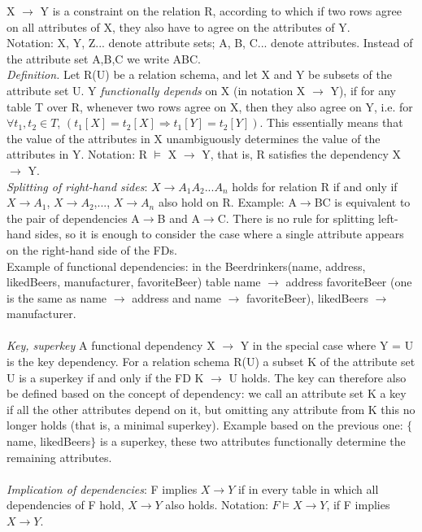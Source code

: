 \documentclass[margin=0px]{article}
\begin{document}
X $\to$ Y is a constraint on the relation R, according to which if two rows agree on all attributes of X, they also have to agree on the attributes of Y. \\
Notation: X, Y, Z... denote attribute sets; A, B, C... denote attributes. Instead of the attribute set {A,B,C} we write ABC. \\
\textit{Definition.} Let R(U) be a relation schema, and let X and Y be subsets of the attribute set U. Y \textit{functionally depends} on X (in notation X $\to$ Y), if for any table T over R, whenever two rows agree on X, then they also agree on Y, i.e. for $\forall t_1, t_2 \in T$, $(t_1[X]=t_2[X] \Rightarrow t_1[Y]=t_2[Y])$. This essentially means that the value of the attributes in X unambiguously determines the value of the attributes in Y. Notation: R $\models$ X $\to$ Y, that is,
R satisfies the dependency X $\to$ Y. \\
\textit{Splitting of right-hand sides}: $X \to A_1A_2...A_n$ holds for relation R if and only if $X \to A_1$, $X \to A_2$,..., $X \to A_n$ also hold on R. Example: A$\to$BC is equivalent to the pair of dependencies A$\to$B and
A$\to$C. There is no rule for splitting left-hand sides, so it is enough to consider the case where a single attribute appears on the right-hand side of the FDs. \\
Example of functional dependencies: in the Beerdrinkers(name, address, likedBeers, manufacturer, favoriteBeer) table name $\to$ address favoriteBeer (one is the same as name $\to$ address and name $\to$ favoriteBeer), likedBeers $\to$ manufacturer. \\ \\
\textit{Key, superkey} A functional dependency X $\to$ Y in the special case where Y = U is the key dependency. For a relation schema R(U) a subset K of the attribute set U is a superkey if and only if the FD K $\to$ U holds. The key can therefore also be defined based on the concept of dependency: we call an attribute set K a key if all the other attributes depend on it, but omitting any attribute from K this no longer holds (that is, a minimal superkey). Example based on the previous one: $\{$name, likedBeers$\}$ is a superkey, these two attributes functionally determine the remaining attributes. \\ \\
\textit{Implication of dependencies}: F implies $X \to Y$ if in every table in which all dependencies of F hold, $X \to Y$ also holds. Notation: $F \models X \to Y$, if F implies $X \to Y$. \\
\end{document}
